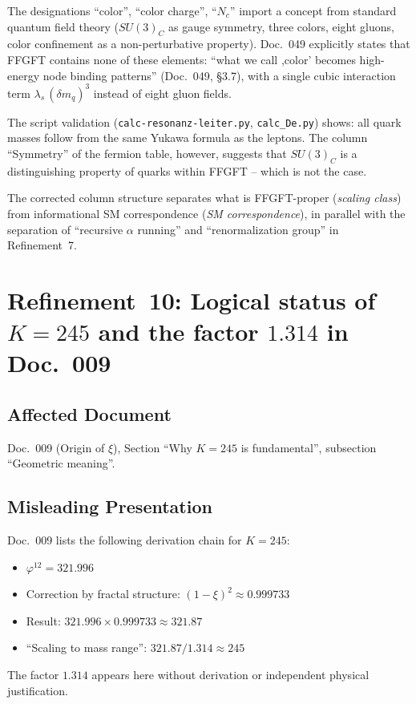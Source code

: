 The designations \enquote{color}, \enquote{color charge}, \enquote{$N_c$}
import a concept from standard quantum field theory ($SU(3)_C$ as
gauge symmetry, three colors, eight gluons, color confinement as a
non-perturbative property). Doc.~049 explicitly states that FFGFT
contains none of these elements: \enquote{what we call ,color' becomes
high-energy node binding patterns} (Doc.~049, §3.7), with a single
cubic interaction term $\lambda_s\,(\delta m_q)^3$ instead of eight
gluon fields.

The script validation (\texttt{calc-resonanz-leiter.py},
\texttt{calc\_De.py}) shows: all quark masses follow from the same
Yukawa formula as the leptons. The column \enquote{Symmetry} of the
fermion table, however, suggests that $SU(3)_C$ is a distinguishing
property of quarks within FFGFT -- which is not the case.

The corrected column structure separates what is FFGFT-proper
(\emph{scaling class}) from informational SM correspondence
(\emph{SM correspondence}), in parallel with the separation of
\enquote{recursive $\alpha$ running} and \enquote{renormalization
group} in Refinement~7.

\section{\texorpdfstring{Refinement~10: Logical status of $K = 245$ and the factor $1.314$ in Doc.~009}{Refinement 10: Logical status of K = 245 and the factor 1.314 in Doc. 009}}

\subsection*{Affected Document}

Doc.~009 (Origin of $\xi$), Section \enquote{Why $K = 245$ is fundamental},
subsection \enquote{Geometric meaning}.

\subsection*{Misleading Presentation}

Doc.~009 lists the following derivation chain for $K = 245$:
\begin{itemize}
  \item $\varphi^{12} = 321.996$
  \item Correction by fractal structure: $(1-\xi)^2 \approx 0.999733$
  \item Result: $321.996 \times 0.999733 \approx 321.87$
  \item \enquote{Scaling to mass range}: $321.87 / 1.314 \approx 245$
\end{itemize}
The factor $1.314$ appears here without derivation or independent
physical justification.

